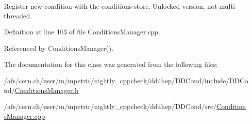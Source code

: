 Register new condition with the conditions store. Unlocked version, not multi-\/threaded. 



Definition at line 103 of file Conditions\+Manager.\+cpp.



Referenced by Conditions\+Manager().



The documentation for this class was generated from the following files\+:\begin{DoxyCompactItemize}
\item 
/afs/cern.\+ch/user/m/mpetric/nightly\+\_\+cppcheck/dd4hep/\+D\+D\+Cond/include/\+D\+D\+Cond/\hyperlink{_conditions_manager_8h}{Conditions\+Manager.\+h}\item 
/afs/cern.\+ch/user/m/mpetric/nightly\+\_\+cppcheck/dd4hep/\+D\+D\+Cond/src/\hyperlink{_conditions_manager_8cpp}{Conditions\+Manager.\+cpp}\end{DoxyCompactItemize}
